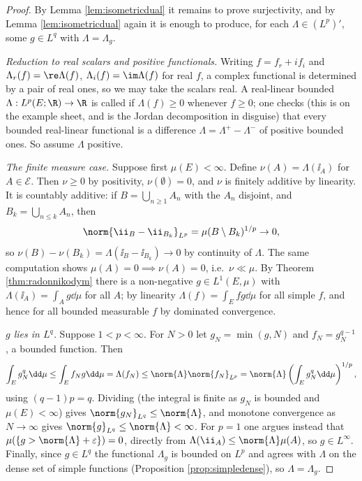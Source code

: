 \begin{proof}
	By Lemma \ref{lem:isometricdual} it remains to prove surjectivity, and by Lemma \ref{lem:isometricdual} again it is enough to produce, for each $\Lambda \in (L^p)'$, some $g \in L^q$ with $\Lambda = \Lambda_g$.

	\emph{Reduction to real scalars and positive functionals.} Writing $f = f_r + i f_i$ and $\Lambda_r(f) = \re \Lambda(f)$, $\Lambda_i(f) = \im \Lambda(f)$ for real $f$, a complex functional is determined by a pair of real ones, so we may take the scalars real. A real-linear bounded $\Lambda : L^p(E;\R) \to \R$ is called  if $\Lambda(f) \ge 0$ whenever $f \ge 0$; one checks (this is on the example sheet, and is the Jordan decomposition in disguise) that every bounded real-linear functional is a difference $\Lambda = \Lambda^+ - \Lambda^-$ of positive bounded ones. So assume $\Lambda$ positive.

	\emph{The finite measure case.} Suppose first $\mu(E) < \infty$. Define $\nu(A) = \Lambda(\ii_A)$ for $A \in \mathcal{E}$. Then $\nu \ge 0$ by positivity, $\nu(\emptyset) = 0$, and $\nu$ is finitely additive by linearity. It is countably additive: if $B = \bigcup_{n \ge 1} A_n$ with the $A_n$ disjoint, and $B_k = \bigcup_{n \le k}A_n$, then
	$$\norm{\ii_B - \ii_{B_k}}_{L^p} = \mu(B \setminus B_k)^{1/p} \to 0,$$
	so $\nu(B) - \nu(B_k) = \Lambda(\ii_{B} - \ii_{B_k}) \to 0$ by continuity of $\Lambda$. The same computation shows $\mu(A) = 0 \implies \nu(A) = 0$, i.e.\ $\nu \ll \mu$. By Theorem \ref{thm:radonnikodym} there is a non-negative $g \in L^1(E,\mu)$ with $\Lambda(\ii_A) = \int_A g \dd\mu$ for all $A$; by linearity $\Lambda(f) = \int_E fg \dd\mu$ for all simple $f$, and hence for all bounded measurable $f$ by dominated convergence.

	\emph{$g$ lies in $L^q$.} Suppose $1 < p < \infty$. For $N > 0$ let $g_N = \min(g, N)$ and $f_N = g_N^{q-1}$, a bounded function. Then
	$$\int_E g_N^{q} \dd\mu \le \int_E f_N g \dd\mu = \Lambda(f_N) \le \norm{\Lambda} \norm{f_N}_{L^p} = \norm{\Lambda}\left( \int_E g_N^{q}\dd\mu\right)^{1/p},$$
	using $(q-1)p = q$. Dividing (the integral is finite as $g_N$ is bounded and $\mu(E) < \infty$) gives $\norm{g_N}_{L^q} \le \norm{\Lambda}$, and monotone convergence as $N \to \infty$ gives $\norm{g}_{L^q}\le \norm{\Lambda} < \infty$. For $p = 1$ one argues instead that $\mu(\{g > \norm{\Lambda}+\varepsilon\}) = 0$, directly from $\Lambda(\ii_A) \le \norm{\Lambda}\mu(A)$, so $g \in L^\infty$. Finally, since $g \in L^q$ the functional $\Lambda_g$ is bounded on $L^p$ and agrees with $\Lambda$ on the dense set of simple functions (Proposition \ref{prop:simpledense}), so $\Lambda = \Lambda_g$.


\end{proof}
